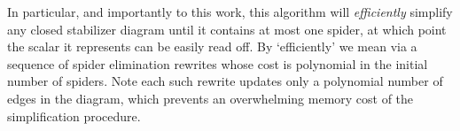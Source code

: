 In particular, and importantly to this work,
this algorithm will \emph{efficiently} simplify any closed stabilizer diagram until it contains at most one spider, at which point the scalar it represents can be easily read off. 
By `efficiently' we mean via a sequence of spider elimination rewrites whose cost is polynomial in the initial number of spiders. Note each such rewrite updates only a polynomial number of edges in the diagram, which prevents an overwhelming memory cost of the simplification procedure.